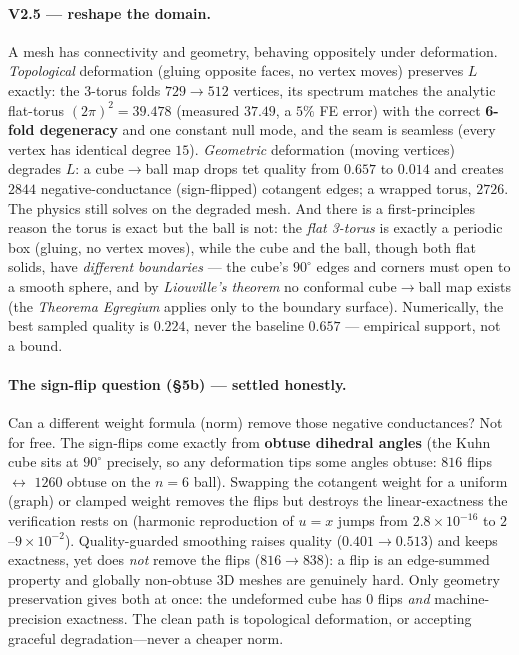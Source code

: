 \documentclass[11pt]{article}
\begin{document}
\paragraph{V2.5 --- reshape the domain.}
A mesh has connectivity and geometry, behaving oppositely under deformation.
\emph{Topological} deformation (gluing opposite faces, no vertex moves) preserves
$L$ exactly: the 3-torus folds $729 \to 512$ vertices, its spectrum matches the
analytic flat-torus $(2\pi)^2 = 39.478$ (measured $37.49$, a $5\%$ FE error) with
the correct \textbf{6-fold degeneracy} and one constant null mode, and the seam is
seamless (every vertex has identical degree $15$). \emph{Geometric} deformation
(moving vertices) degrades $L$: a cube$\to$ball map drops tet quality from $0.657$
to $0.014$ and creates $2844$ negative-conductance (sign-flipped) cotangent edges;
a wrapped torus, $2726$. The physics still solves on the degraded mesh. And there
is a first-principles reason the torus is exact but the ball is not: the
\emph{flat 3-torus} is exactly a periodic box (gluing, no vertex moves), while the
cube and the ball, though both flat solids, have \emph{different boundaries} ---
the cube's $90^\circ$ edges and corners must open to a smooth sphere, and by
\emph{Liouville's theorem} no conformal cube$\to$ball map exists (the
\emph{Theorema Egregium} applies only to the boundary surface). Numerically, the
best sampled quality is $0.224$, never the baseline $0.657$ --- empirical
support, not a bound.

\paragraph{The sign-flip question (\S5b) --- settled honestly.}
Can a different weight formula (norm) remove those negative conductances? Not for
free. The sign-flips come exactly from \textbf{obtuse dihedral angles} (the Kuhn
cube sits at $90^\circ$ precisely, so any deformation tips some angles obtuse:
$816$ flips $\leftrightarrow$ $1260$ obtuse on the $n{=}6$ ball). Swapping the
cotangent weight for a uniform (graph) or clamped weight removes the flips but
destroys the linear-exactness the verification rests on (harmonic reproduction of
$u=x$ jumps from $2.8\times10^{-16}$ to $2$--$9\times10^{-2}$). Quality-guarded
smoothing raises quality ($0.401 \to 0.513$) and keeps exactness, yet does
\emph{not} remove the flips ($816 \to 838$): a flip is an edge-summed property and
globally non-obtuse 3D meshes are genuinely hard. Only geometry preservation gives
both at once: the undeformed cube has $0$ flips \emph{and} machine-precision
exactness. The clean path is topological deformation, or accepting graceful
degradation---never a cheaper norm.
\end{document}
